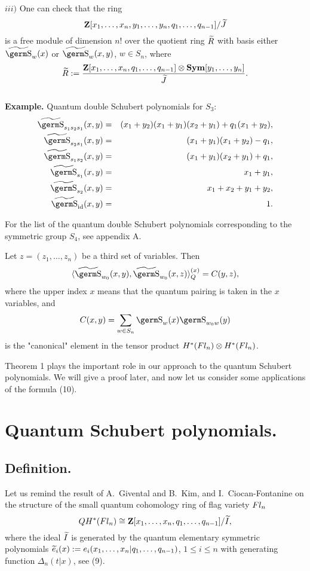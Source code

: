 {$iii)$ One can check that the ring
$${\bf Z}[x_1,\ldots ,x_n,y_1,\ldots ,y_n,q_1,\ldots ,q_{n-1}]/{\widetilde J}
$$
is a free module of dimension $n!$ over the quotient ring $\widetilde R$ with basis 
either $\wt{\s}_w(x)$ or $\wt{\s}_w(x,y)$, $w\in S_n$, where
$$\widetilde R:=\frac{{\bf Z}[x_1,\ldots ,x_n,q_1,\ldots ,q_{n-1}]\otimes 
{\bf Sym}[y_1,\ldots ,y_n]}{\widetilde J}.
$$
\smallskip \\ 
{\bf Example.} Quantum double Schubert polynomials for $S_3$:
\begin{eqnarray*}\wt{\s}_{s_1s_2s_1}(x,y) &=& 
(x_1+y_2)(x_1+y_1)(x_2+y_1)+q_1(x_1+y_2),\\
\wt{\s}_{s_2s_1}(x,y) &=& (x_1+y_1)(x_1+y_2)-q_1,\\
\wt{\s}_{s_1s_2}(x,y) &=& (x_1+y_1)(x_2+y_1)+q_1,\\
\wt{\s}_{s_1}(x,y) &=& x_1+y_1,\\
\wt{\s}_{s_2}(x,y) &=& x_1 +x_2+y_1+y_2,\\
\wt{\s}_{\rm id}(x,y) &=& 1.
\end{eqnarray*}

For the list of the quantum double Schubert polynomials corresponding
to the symmetric group $S_4$, see appendix A.

{\begin{th} Let $z=(z_1,\ldots ,z_n)$ be a third set of variables. Then
\begin{equation}
\langle\wt{\s}_{w_0}(x,y),\wt{\s}_{w_0}(x,z)\rangle_Q^{(x)}=C(y,z),\label{6}
\end{equation}
where the upper index $x$ means that the quantum pairing is taken in the 
$x$ variables, and
$$C(x,y)=\sum_{w\in S_n}\s_w(x)\s_{w_0w}(y)
$$
is the "canonical" element in the tensor product $H^*(\hbox{$Fl_n$} )\otimes 
H^*(\hbox{$Fl_n$} )$.
\end{th}

Theorem 1 plays the important role in our approach to the 
quantum Schubert polynomials. We will give a proof later, and now let us 
consider some applications of the formula (10). 

\section{Quantum Schubert polynomials.}

\subsection{Definition.}

Let us remind the result of A.~Givental and B.~Kim, and 
I.~Ciocan-Fontanine on the structure of the small quantum cohomology ring 
of flag variety $\hbox{$Fl_n$}$ 
$$QH^*({\hbox{$Fl_n$}})\cong{\bf Z} [ x_1,\ldots ,x_n,q_1,\ldots ,q_{n-1} ] /\widetilde I,
$$
where the ideal $\widetilde I$ is 
generated by the quantum elementary symmetric polynomials $\widetilde e_i(x):=
e_i(x_1,\ldots ,x_n|q_1,\ldots ,q_{n-1})$, $1\le i\le n$ with generating 
function $\Delta_n(t|x)$, see (9).

}}
